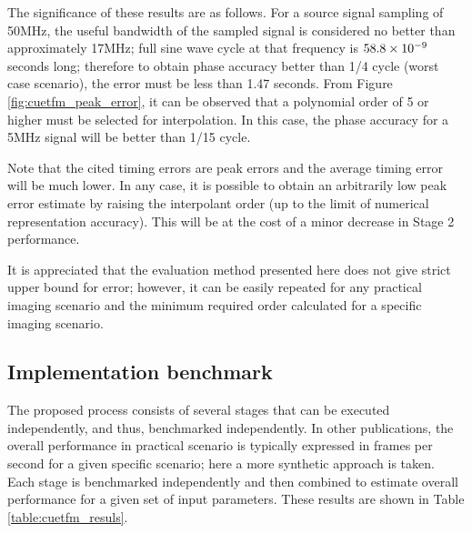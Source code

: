 The significance of these results are as follows. For a source signal sampling of 50MHz, the useful bandwidth of the sampled signal is considered no better than approximately 17MHz;  full sine wave cycle at that frequency is $58.8\times 10^{-9}$ seconds long; therefore to obtain phase accuracy better than 1/4 cycle (worst case scenario), the error must be less than 1.47 seconds. From Figure \ref{fig:cuetfm_peak_error}, it can be observed that a polynomial order of 5 or higher must be selected for interpolation. In this case, the phase accuracy for a 5MHz signal will be better than 1/15 cycle. 

Note that the cited timing errors are peak errors and the average timing error will be much lower. In any case, it is possible to obtain an arbitrarily low peak error estimate by raising the interpolant order (up to the limit of numerical representation accuracy). This will be at the cost of a minor decrease in Stage 2 performance. 

It is appreciated that the evaluation method presented here does not give strict upper bound for error; however, it can be easily repeated for any practical imaging scenario and the minimum required order calculated for a specific imaging scenario.

\subsection{Implementation benchmark}
The proposed process consists of several stages that can be executed independently, and thus, benchmarked independently. In other publications, the overall performance in practical scenario is typically expressed in frames per second for a given specific scenario\cite{choe_gpu-based_2013,phuong_design_2015,gjerald_real-time_2011}; here a more synthetic approach is taken. Each stage is benchmarked independently and then combined to estimate overall performance for a given set of input parameters. These results are shown in Table \ref{table:cuetfm_resuls}.

